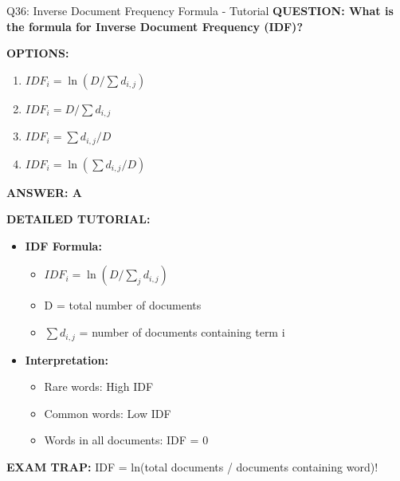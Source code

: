 \documentclass[8pt]{beamer}
\begin{document}
	\begin{frame}{Q36: Inverse Document Frequency Formula - Tutorial}
		\fontsize{6.5}{7.5}\selectfont
		\textbf{QUESTION: What is the formula for Inverse Document Frequency (IDF)?}
		
		\vspace{0.1cm}
		\textbf{OPTIONS:}
		\begin{enumerate}
			\item $IDF_i = \ln(D / \sum d_{i,j})$
			\item $IDF_i = D / \sum d_{i,j}$
			\item $IDF_i = \sum d_{i,j} / D$
			\item $IDF_i = \ln(\sum d_{i,j} / D)$
		\end{enumerate}
		
		\vspace{0.1cm}
		\textcolor{myblue}{\textbf{ANSWER: A}}
		
		\vspace{0.1cm}
		\textbf{DETAILED TUTORIAL:}
		\begin{itemize}
			\item \textbf{IDF Formula:}
			\begin{itemize}
				\item $IDF_i = \ln(D / \sum_{j} d_{i,j})$
				\item D = total number of documents
				\item $\sum d_{i,j}$ = number of documents containing term i
			\end{itemize}
			\item \textbf{Interpretation:}
			\begin{itemize}
				\item Rare words: High IDF
				\item Common words: Low IDF
				\item Words in all documents: IDF = 0
			\end{itemize}
		\end{itemize}
		
		\textcolor{myred}{\textbf{EXAM TRAP:}} IDF = \textcolor{myblue}{ln(total documents / documents containing word)}!
	\end{frame}
	
\end{document}
